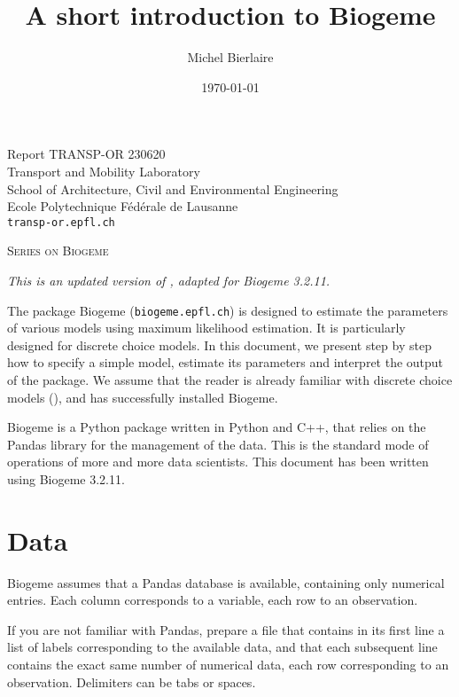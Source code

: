\documentclass[12pt,a4paper]{article}
\title{A short introduction to Biogeme}
\author{Michel Bierlaire}
\date{\today}
\begin{document}
\begin{titlepage}
\pagestyle{empty}

\maketitle
\vspace{2cm}

\begin{center}
\small Report TRANSP-OR 230620 \\ Transport and Mobility Laboratory \\ School of Architecture, Civil and Environmental Engineering \\ Ecole Polytechnique F\'ed\'erale de Lausanne \\ \verb+transp-or.epfl.ch+
\begin{center}
\textsc{Series on Biogeme}
\end{center}

\emph{This is an updated version of , adapted for
  Biogeme 3.2.11.}
\end{center}


\clearpage
\end{titlepage}


The package Biogeme (\texttt{biogeme.epfl.ch}) is designed to estimate the parameters of
various models using maximum likelihood estimation. It is particularly
designed for discrete choice models. In this document, we present step
by step how to specify a simple model, estimate its parameters and
interpret the output of the  package.  We assume that the
reader is already familiar with discrete choice models (\cite{BenALerm85}), and has
successfully installed Biogeme. 



Biogeme is a  Python
package written in Python and C++, that relies on the Pandas library
for the management of the data. This is the standard mode of operations of more and more
data scientists.   This document has been written using
Biogeme 3.2.11.

\section{Data}

Biogeme assumes that a Pandas database is available, containing only numerical
entries. Each column corresponds to a variable, each row to an
observation.

If you are not familiar with Pandas, prepare a file that contains in its first line a list
of labels corresponding to the available data, and that each
subsequent line contains the exact same number of numerical data, each
row corresponding to an observation. Delimiters can be tabs or
spaces. 
\end{document}
